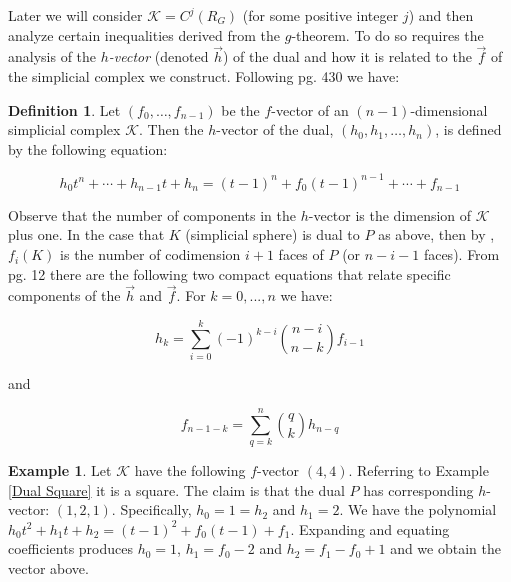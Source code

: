 \documentclass[oneside,12pt]{amsart}
\theoremstyle{definition}
\newtheorem{Definition}[Theorem]{Definition}
\newtheorem{Example}[Theorem]{Example}
\numberwithin{equation}{section}
\begin{document}
Later we will consider $\mathcal{K} = C^j(R_G)$ (for some positive integer $j$) and then analyze certain inequalities derived from the $g$-theorem.  To do so requires the analysis of the \textit{$h$-vector} (denoted $\overrightarrow{h}$) of the dual and how it is related to the $\overrightarrow{f}$ of the simplicial complex we construct.  Following \cite{DJ} pg. 430 we have:



\begin{Definition}
Let $(f_0,\ldots,f_{n-1})$ be the $f$-vector of an $(n-1)$-dimensional simplicial complex $\mathcal{K}$. Then the $h$-vector of the dual, $(h_0, h_1,\ldots,h_n)$, is defined by the following equation:

$$h_0t^n + \cdots+ h_{n-1}t + h_n  = (t-1)^n + f_0(t-1)^{n-1} + \cdots + f_{n-1}$$

\end{Definition}

Observe that the number of components in the $h$-vector is the dimension of $\mathcal{K}$ plus one.  In the case that $K$ (simplicial sphere) is dual to $P$ as above, then by \cite{DJ}, $f_i(K)$ is the number of codimension $i+1$ faces of $P$ (or $n-i-1$ faces). From \cite{BP1} pg. 12 there are the following two compact equations that relate specific components of the $\overrightarrow{h}$ and $\overrightarrow{f}$.  For $k = 0,...,n$
we have:\\

\begin{center}
$$h_k = \sum_{i = 0}^k (-1)^{k-i}\binom{n-i}{n-k}f_{i-1}$$
\end{center}

and
\begin{center}
$$f_{n-1-k} = \sum_{q = k}^n \binom{q}{k}h_{n-q}$$
\end{center}

\begin{Example}

Let $\mathcal{K}$ have the following $f$-vector  $(4,4)$.  Referring to Example \ref{Dual Square} it is a square.  The claim is that the dual $P$ has corresponding $h$-vector:  $(1,2,1)$.  Specifically, $h_0 =1 = h_2$ and $h_1 =2$.  We have the polynomial $h_0t^2 + h_1t+h_2 = (t-1)^2 + f_0(t-1) + f_1$.  Expanding and equating coefficients produces $h_0 =  1$, $h_1 = f_0 -2$ and $h_2 = f_1 - f_0 +1$ and we obtain the vector above.

\end{Example}
\end{document}
